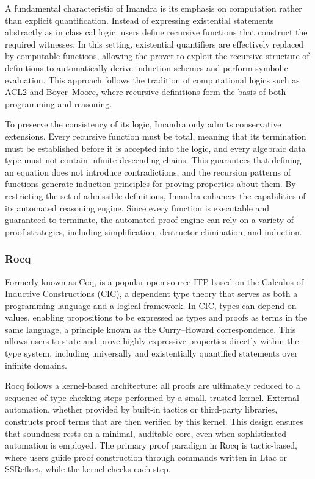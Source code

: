 A fundamental characteristic of Imandra is its emphasis on computation rather than explicit quantification. Instead of expressing existential statements abstractly as in classical logic, users define recursive functions that construct the required witnesses. In this setting, existential quantifiers are effectively replaced by computable functions, allowing the prover to exploit the recursive structure of definitions to automatically derive induction schemes and perform symbolic evaluation. This approach follows the tradition of computational logics such as ACL2 and Boyer--Moore, where recursive definitions form the basis of both programming and reasoning.

To preserve the consistency of its logic, Imandra only admits conservative extensions. Every recursive function must be total, meaning that its termination must be established before it is accepted into the logic, and every algebraic data type must not contain infinite descending chains. This guarantees that defining an equation does not introduce contradictions, and the recursion patterns of functions generate induction principles for proving properties about them. By restricting the set of admissible definitions, Imandra enhances the capabilities of its automated reasoning engine. Since every function is executable and guaranteed to terminate, the automated proof engine can rely on a variety of proof strategies, including simplification, destructor elimination, and induction.

\subsubsection{Rocq}

Formerly known as Coq, is a popular open-source ITP based on the Calculus of Inductive Constructions (CIC), a dependent type theory that serves as both a programming language and a logical framework. In CIC, types can depend on values, enabling propositions to be expressed as types and proofs as terms in the same language, a principle known as the Curry--Howard correspondence. This allows users to state and prove highly expressive properties directly within the type system, including universally and existentially quantified statements over infinite domains.

Rocq follows a kernel-based architecture: all proofs are ultimately reduced to a sequence of type-checking steps performed by a small, trusted kernel. External automation, whether provided by built-in tactics or third-party libraries, constructs proof terms that are then verified by this kernel. This design ensures that soundness rests on a minimal, auditable core, even when sophisticated automation is employed. The primary proof paradigm in Rocq is tactic-based, where users guide proof construction through commands written in Ltac or SSReflect, while the kernel checks each step.

